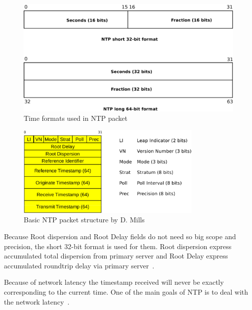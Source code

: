 \begin{figure}
	\centering
	\includegraphics[width=13cm,keepaspectratio]{fig/ntp-timestamps.pdf}
	\caption{Time formats used in NTP packet}
	\label{fig:ntp-timestamps}
	\bigskip
\end{figure}


\begin{figure}
	\centering
	\includegraphics[width=9cm,keepaspectratio]{fig/ntp-packet.pdf}
	\caption{Basic NTP packet structure by D. Mills}
	\label{fig:ntp-packet}
	\bigskip
\end{figure}

Because Root dispersion and Root Delay fields do not need so big scope and precision,
the short 32-bit format is used for them.
Root dispersion express accumulated total dispersion from primary server
and Root Delay express accumulated roundtrip delay via primary server~\cite{ntp-arch}.



Because of network latency the timestamp received will never be exactly corresponding to
the current time.
One of the main goals of NTP is to deal with the network latency~\cite{ntp-overview}.
